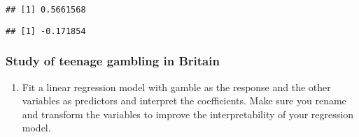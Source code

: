 \documentclass[]{article}
\newenvironment{Shaded}{\begin{snugshade}}{\end{snugshade}}
\newcommand{\CommentTok}[1]{\textcolor[rgb]{0.56,0.35,0.01}{\textit{#1}}}
\newcommand{\DataTypeTok}[1]{\textcolor[rgb]{0.13,0.29,0.53}{#1}}
\newcommand{\DecValTok}[1]{\textcolor[rgb]{0.00,0.00,0.81}{#1}}
\newcommand{\KeywordTok}[1]{\textcolor[rgb]{0.13,0.29,0.53}{\textbf{#1}}}
\newcommand{\NormalTok}[1]{#1}
\newcommand{\OperatorTok}[1]{\textcolor[rgb]{0.81,0.36,0.00}{\textbf{#1}}}
\newcommand{\StringTok}[1]{\textcolor[rgb]{0.31,0.60,0.02}{#1}}
\providecommand{\tightlist}{%
  \setlength{\itemsep}{0pt}\setlength{\parskip}{0pt}}
\begin{document}
\begin{verbatim}
## [1] 0.5661568
\end{verbatim}

\begin{Shaded}
\end{Shaded}

\begin{verbatim}
## [1] -0.171854
\end{verbatim}

\hypertarget{study-of-teenage-gambling-in-britain}{%
\subsubsection{Study of teenage gambling in
Britain}\label{study-of-teenage-gambling-in-britain}}

\begin{enumerate}
\def\labelenumi{\arabic{enumi}.}
\tightlist
\item
  Fit a linear regression model with gamble as the response and the
  other variables as predictors and interpret the coefficients. Make
  sure you rename and transform the variables to improve the
  interpretability of your regression model.
\end{enumerate}
\end{document}
